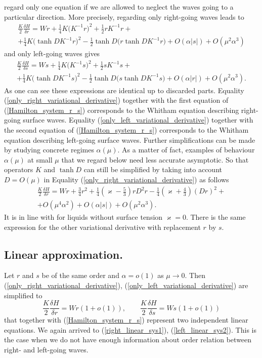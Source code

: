 regard only one equation if we are allowed to neglect the waves
going to a particular direction.
More precisely, regarding only right-going waves leads to
%
\begin{multline}
\label{only_right_variational_derivative}
	\frac{K}{2} \frac{\delta H}{\delta r}
	=
	Wr + \frac 14 K \big( K^{-1} r \big)^2 +
	\frac 12 r K^{-1} r
	+
	\\
	+
	\frac 14 K \big( \tanh D K^{-1} r \big)^2 -
	\frac 12 \tanh D \big( r \tanh D K^{-1} r \big)
	+ O(\alpha |s|) + O(\mu^2 \alpha^3)
\end{multline}
%
and only left-going waves gives
%
\begin{multline}
\label{only_left_variational_derivative}
	\frac{K}{2} \frac{\delta H}{\delta s}
	=
	Ws + \frac 14 K \big( K^{-1} s \big)^2 +
	\frac 12 s K^{-1} s
	+
	\\
	+
	\frac 14 K \big( \tanh D K^{-1} s \big)^2 -
	\frac 12 \tanh D \big( s \tanh D K^{-1} s \big)
	+ O(\alpha |r|) + O(\mu^2 \alpha^3)
	.
\end{multline}
%
As one can see these expressions are identical up to discarded parts.
Equality (\ref{only_right_variational_derivative}) together with the
first equation of (\ref{Hamilton_system_r_s}) corresponds to the
Whitham equation describing right-going surface waves.
Equality (\ref{only_left_variational_derivative}) together with the
second equation of (\ref{Hamilton_system_r_s}) corresponds to the
Whitham equation describing left-going surface waves.
Further simplifications can be made by studying
concrete regimes $\alpha(\mu)$.
As a matter of fact, examples of behaviour $\alpha(\mu)$ at small $\mu$
that we regard below need less accurate asymptotic.
So that operators $K$ and $\tanh D$ can still be simplified by
taking into account $D = O(\mu)$ in Equality
(\ref{only_right_variational_derivative}) as follows
%
\begin{multline}
\label{simplified_variational_derivative}
	\frac{K}{2} \frac{\delta H}{\delta r}
	=
	Wr + \frac 34 r^2 +
	\frac 14 \left( \varkappa - \frac 53 \right) r D^2 r
	-
	\frac 14 \left( \varkappa + \frac 43 \right) (D r)^2
	+
	\\
	+
	O(\mu^4 \alpha^2) + O(\alpha |s|) + O(\mu^2 \alpha^3)
	.
\end{multline}
%
It is in line with \cite{Moldabayev2015} for liquids
without surface tension $\varkappa = 0$.
There is the same expression for the other variational derivative
with replacement $r$ by $s$.
%
%
\subsection{Linear approximation.}
%
%
Let $r$ and $s$ be of the same order and $\alpha = o(1)$ as $\mu \to 0$.
Then (\ref{only_right_variational_derivative}),
(\ref{only_left_variational_derivative}) are simplified to
%
\[
	\frac{K}{2} \frac{\delta H}{\delta r} = Wr (1 + o(1))
	, \qquad
	\frac{K}{2} \frac{\delta H}{\delta s} = Ws (1 + o(1))
\]
%
that together with (\ref{Hamilton_system_r_s}) represent two
independent linear equations.
We again arrived to (\ref{right_linear_sys1}), (\ref{left_linear_sys2}).
This is the case when we do not have enough information about
order relation between right- and left-going waves.
%
%
